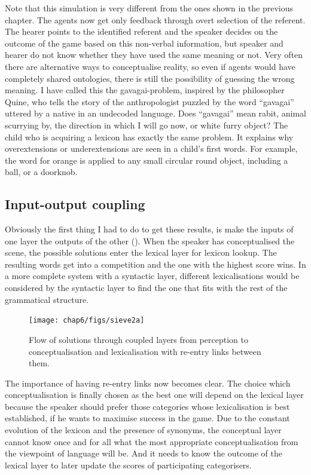 Note that this simulation is very different from the 
ones shown in the previous chapter. The agents now get 
only feedback through overt selection of the referent. 
The hearer points to the identified referent and the speaker 
decides on the outcome of the game based on this 
non-verbal information, but speaker and hearer do not 
know whether they have used the same meaning or not. 
Very often there are alternative ways
to conceptualise reality, so even if agents would have
completely shared ontologies, there is still the possibility 
of guessing the wrong meaning. I have called this
the gavagai-problem, inspired by the philosopher
Quine, who tells the story of the anthropologist 
puzzled by the word ``gavagai'' uttered by a native 
in an undecoded language. Does ``gavagai'' mean rabit, animal 
scurrying by, the direction in which I will go 
now, or white furry object? 
The child who is acquiring a lexicon has
exactly the same problem. It explains why 
overextensions or underextensions
are seen in a child's first words. For example, 
the word for orange is applied to any small circular round 
object, including a ball, or a doorknob.

\subsection{Input-output coupling}

Obviously the first thing I had to do to get 
these results, is make the inputs of one layer the
outputs of the other (). When the 
speaker has conceptualised the scene, the possible
solutions enter the lexical layer for lexicon lookup. 
The resulting words get into a competition and the 
one with the highest score wins. In a more complete
system with a syntactic layer, different lexicalisations
would be considered by the syntactic layer to find 
the one that fits with the rest of the grammatical 
structure. 


\begin{figure}[htbp]
  \centerline{\texttt{[image: chap6/figs/sieve2a]}}
\caption{\label{sieve2a} Flow of solutions through 
coupled layers from perception to conceptualisation and lexicalisation with re-entry links between them.} 
\end{figure}

The importance of having re-entry links now becomes
clear. The choice which conceptualisation is finally chosen 
as the best one will depend on the lexical layer because 
the speaker should prefer those categories whose 
lexicalisation is best established, if he wants to 
maximise success in the game. Due to the constant evolution
of the lexicon and the presence of synonyms, the conceptual
layer cannot know once and for all what the most
appropriate conceptualisation from the viewpoint of 
language will be. And it needs to know the outcome of the
lexical layer to later update the scores of participating
categorisers. 


